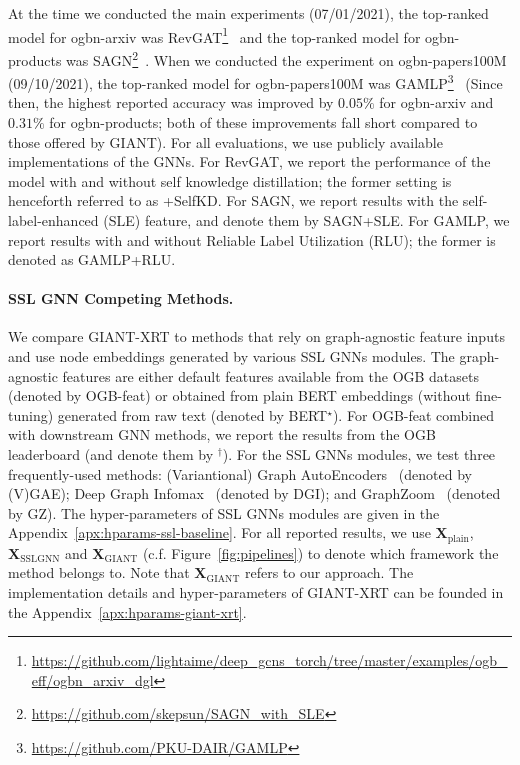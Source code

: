 \documentclass{article} \usepackage{iclr2022_conference,times}
\begin{document}
At the time we conducted the main experiments (07/01/2021), the top-ranked model for ogbn-arxiv was RevGAT\footnote{\url{https://github.com/lightaime/deep_gcns_torch/tree/master/examples/ogb_eff/ogbn_arxiv_dgl}}~\citep{li2021training} and the top-ranked model for ogbn-products was SAGN\footnote{\url{https://github.com/skepsun/SAGN_with_SLE}}~\citep{sun2021scalable}. When we conducted the experiment on ogbn-papers100M (09/10/2021), the top-ranked model for ogbn-papers100M was GAMLP\footnote{\url{https://github.com/PKU-DAIR/GAMLP}}~\citep{zhang2021graph} (Since then, the highest reported accuracy was improved by $0.05\%$ for ogbn-arxiv and $0.31\%$ for ogbn-products; both of these improvements fall short compared to those offered by GIANT). For all evaluations, we use publicly available implementations of the GNNs. For RevGAT, we report the performance of the model with and without self knowledge distillation; the former setting is henceforth referred to as +SelfKD. For SAGN, we report results with the self-label-enhanced (SLE) feature, and denote them by SAGN+SLE. For GAMLP, we report results with and without Reliable Label Utilization (RLU); the former is denoted as GAMLP+RLU.

\paragraph{SSL GNN Competing Methods.}
We compare GIANT-XRT to methods that rely on graph-agnostic feature inputs and use node embeddings generated by various SSL GNNs modules. The graph-agnostic features are either default features available from the OGB datasets (denoted by OGB-feat) or obtained from plain BERT embeddings (without fine-tuning) generated from raw text (denoted by BERT$^\star$). For OGB-feat combined with downstream GNN methods, we report the results from the OGB leaderboard (and denote them by $^\dagger$).
For the SSL GNNs modules, we test three frequently-used methods:
(Variantional) Graph AutoEncoders~\citep{kipf2016variational} (denoted by (V)GAE); Deep Graph Infomax~\citep{velickovic2019deep} (denoted by DGI); and GraphZoom~\citep{deng2020graphzoom} (denoted by GZ).
The hyper-parameters of SSL GNNs modules are given in the Appendix~\ref{apx:hparams-ssl-baseline}.
For all reported results, we use $\mathbf{X}_{\text{plain}}$, $\mathbf{X}_{\text{SSLGNN}}$ and $\mathbf{X}_{\text{GIANT}}$ (c.f. Figure~\ref{fig:pipelines}) to denote which framework the method belongs to. Note that $\mathbf{X}_{\text{GIANT}}$ refers to our approach. The implementation details and hyper-parameters of GIANT-XRT can be founded in the Appendix~\ref{apx:hparams-giant-xrt}.
\end{document}
